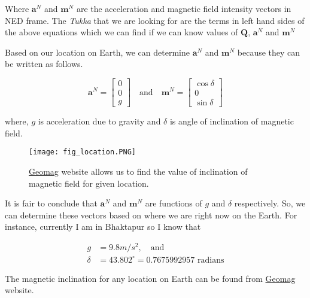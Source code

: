 \documentclass[12pt]{article}
\begin{document}
Where $\bm{a}^{N}$ and $\bm{m}^{N}$ are the acceleration and magnetic field intensity vectors in NED frame. The \textit{Tukka} that we are looking for are the terms in left hand sides of the above equations which we can find if we can know values of $\bm{Q}$, $\bm{a}^{N}$ and $\bm{m}^{N}$\medskip

Based on our location on Earth, we can determine $\bm{a}^{N}$ and $\bm{m}^{N}$ because they can be written as follows.

\begin{equation}
    \bm{a}^{N} = \begin{bmatrix} 0\\ 0\\ g\end{bmatrix}
    \quad \text{and} \quad
    \bm{m}^{N} = \begin{bmatrix} \cos\delta\\ 0\\\sin\delta\end{bmatrix}
    \label{eqn::vect_ned}      
\end{equation}

where, $g$ is acceleration due to gravity and $\delta$ is angle of inclination of magnetic field. \medskip

\begin{figure}[ht]
    \begin{center}
        \texttt{[image: fig\_location.PNG]}
        \caption{\href{http://www.geomag.bgs.ac.uk/data_service/models_compass/igrf_calc.html}{\color{red}Geomag} website allows us to find the value of inclination of magnetic field for given location.}        
    \end{center}
\end{figure}

It is fair to conclude that $\bm{a}^{N}$ and $\bm{m}^{N}$ are functions of $g$ and $\delta$ respectively. So, we can determine these vectors based on where we are right now on the Earth. For instance, currently I am in Bhaktapur so I know that

\begin{equation*}
    \begin{split}
        g &= 9.8 m/s^{2}, \quad \text{and}\\
        \delta &= 43.802^{\circ} = 0.7675992957 \text{ radians}
    \end{split}
\end{equation*}

The magnetic inclination for any location on Earth can be found from \href{http://www.geomag.bgs.ac.uk/data_service/models_compass/igrf_calc.html}{\color{red}Geomag} website.
\end{document}
